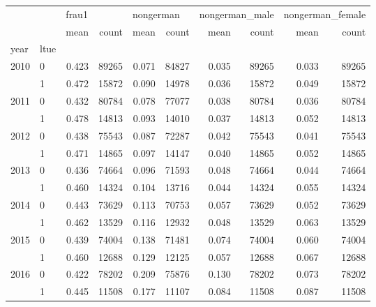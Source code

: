 \begin{tabular}{llrrrrrrrr}
\toprule
     &   & \multicolumn{2}{l}{frau1} & \multicolumn{2}{l}{nongerman} & \multicolumn{2}{l}{nongerman\_male} & \multicolumn{2}{l}{nongerman\_female} \\
     &   &  mean &  count &      mean &  count &           mean &  count &             mean &  count \\
year & ltue &       &        &           &        &                &        &                  &        \\
\midrule
2010 & 0 & 0.423 &  89265 &     0.071 &  84827 &          0.035 &  89265 &            0.033 &  89265 \\
     & 1 & 0.472 &  15872 &     0.090 &  14978 &          0.036 &  15872 &            0.049 &  15872 \\
2011 & 0 & 0.432 &  80784 &     0.078 &  77077 &          0.038 &  80784 &            0.036 &  80784 \\
     & 1 & 0.478 &  14813 &     0.093 &  14010 &          0.037 &  14813 &            0.052 &  14813 \\
2012 & 0 & 0.438 &  75543 &     0.087 &  72287 &          0.042 &  75543 &            0.041 &  75543 \\
     & 1 & 0.471 &  14865 &     0.097 &  14147 &          0.040 &  14865 &            0.052 &  14865 \\
2013 & 0 & 0.436 &  74664 &     0.096 &  71593 &          0.048 &  74664 &            0.044 &  74664 \\
     & 1 & 0.460 &  14324 &     0.104 &  13716 &          0.044 &  14324 &            0.055 &  14324 \\
2014 & 0 & 0.443 &  73629 &     0.113 &  70753 &          0.057 &  73629 &            0.052 &  73629 \\
     & 1 & 0.462 &  13529 &     0.116 &  12932 &          0.048 &  13529 &            0.063 &  13529 \\
2015 & 0 & 0.439 &  74004 &     0.138 &  71481 &          0.074 &  74004 &            0.060 &  74004 \\
     & 1 & 0.460 &  12688 &     0.129 &  12125 &          0.057 &  12688 &            0.067 &  12688 \\
2016 & 0 & 0.422 &  78202 &     0.209 &  75876 &          0.130 &  78202 &            0.073 &  78202 \\
     & 1 & 0.445 &  11508 &     0.177 &  11107 &          0.084 &  11508 &            0.087 &  11508 \\
\bottomrule
\end{tabular}
